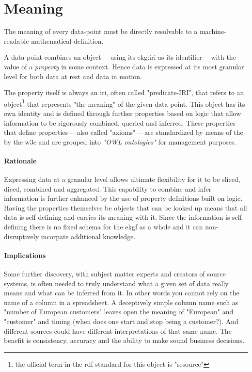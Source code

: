 \section{Meaning}\label{sec:ekg-principle-meaning}

The meaning of every \gls{data-point} must be directly resolvable 
to a machine-readable mathematical definition.

A \gls{data-point} combines an object\,---\,using its \gls{ekg:iri} as its identifier\,---\,with the value
of a \textit{property} in some context.
Hence data is expressed at its most granular level for both data at rest and data in motion.

The property itself is always an \gls{iri}, often called "predicate-IRI", that refers to an object\footnote{%
    the official term in the \gls{rdf} standard for this object is "resource"%
} that represents "the meaning" of the given \gls{data-point}.
This object has its own identity and is defined through further properties
based on logic that allow information to be rigorously combined, queried and inferred.
These properties that define properties\,---\,also called "axioms"\,---\,are standardized by means of the 
by the \gls{w3c} and are grouped into \textit{"OWL ontologies"} for management purposes.


\paragraph{Rationale} Expressing data at a granular level allows ultimate flexibility 
for it to be sliced, diced, combined and aggregated. This capability to combine and 
infer information is further enhanced by the use of \gls{property} definitions built on logic.
Having the properties themselves be objects that can be looked up means that all data 
is self-defining and carries its meaning with it.
Since the information is self-defining there is no fixed schema for the \gls{ekgf} 
as a whole and it can non-disruptively incorpate additional knowledge.

\paragraph{Implications} Some further discovery, with subject matter experts and 
creators of source systems, is often needed to truly understand what a given 
set of data really means and what can be inferred from it. 
In other words you cannot rely on the name of a column in a spreadsheet. 
A deceptively simple column name such as "number of European customers" leaves 
open the meaning of "European" and "customer" and timing (when does one start 
and stop being a customer?). And different sources could have different 
interpretations of that same name.
The benefit is consistency, accuracy and the ability to make sound business decisions.


